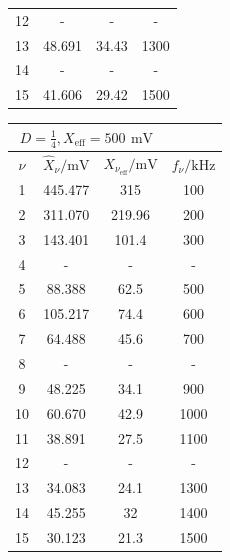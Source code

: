 \documentclass[a4paper, 12pt]{article}
\begin{document}
\begin{center}
\begin{tabular}{@{}cccc@{}}
        12    & -                                & -                                       & -                          \\
        13    & 48.691                           & 34.43                                   & 1300                       \\
        14    & -                                & -                                       & -                          \\
        15    & 41.606                           & 29.42                                   & 1500                       \\ \bottomrule
      \end{tabular}
      \egroup

      \bgroup
      \def\arraystretch{1.6180339887498948}
        \begin{tabular}{@{}cccc@{}}
        \toprule
        \multicolumn{3}{c}{$D = \frac{1}{4}, X_{\text{eff}}=500 \,\ \si{\milli\volt}$} \\ \midrule
        $\nu$      & $\hat{X}_\nu / \si{\milli\volt}$   & $X_{\nu_{\text{eff}}} / \si{\milli\volt}$ & $f_\nu / \si{\kilo\hertz}$ \\ \hline
        1  & 445.477     & 315        & 100      \\
        2  & 311.070     & 219.96     & 200      \\
        3  & 143.401     & 101.4      & 300      \\
        4  & -            & -           &  -        \\
        5  & 88.388      & 62.5       & 500      \\
        6  & 105.217     & 74.4       & 600      \\
        7  & 64.488      & 45.6       & 700      \\
        8  &  -           &   -         &    -      \\
        9  & 48.225      & 34.1       & 900      \\
        10 & 60.670      & 42.9       & 1000     \\
        11 & 38.891      & 27.5       & 1100     \\
        12 &  -           &  -          &   -       \\
        13 & 34.083      & 24.1       & 1300     \\
        14 & 45.255      & 32         & 1400     \\
        15 & 30.123      & 21.3       & 1500     \\ \bottomrule
        \end{tabular}
        \egroup


\end{center}
\end{document}
